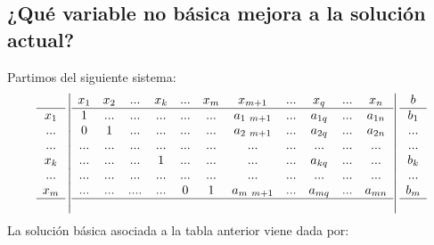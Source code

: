 \documentclass[11pt,fleqn]{book} %
\begin{document}
\subsection{¿Qué variable no básica mejora a la solución actual?}
Partimos del siguiente sistema:
$$
\begin{array}{c}
  \\ \hline
  x_1 \\
  ... \\
  ... \\
  x_k \\
  ... \\
  x_m \\ \hline
  ~
\end{array}
\left|
\begin{array}{cccccc}
  x_1 & x_2 & ... & x_k & ... & x_m \\ \hline
  1 & ... & ... &...& ...& ... \\
  0 & 1 & ... & ...& ...& ... \\
  ... & ... & ... & ... & ...& ... \\
  ... & ... & ... & 1 & ...& ... \\
  ... & ... & ... & ... & ...& ... \\
  ... & ...& .... & ... &  0  & 1\\ \hline
  & & & 
\end{array}
\begin{array}{ccccc}
  x_{m+1} & ... & x_q & ... & x_n \\ \hline
  a_{1 ~ m+1} & ... & a_{1q} & ... & a_{1n} \\
  a_{2 ~ m+1} & ... & a_{2q} & ... & a_{2n} \\
  ... & ... & ... & ...& ... \\
  ... & ... & a_{kq} & ...& ... \\
  ... & ... & ... & ...& ... \\
  a_{m ~ m+1} & ... & a_{mq} & ... & a_{mn} \\ \hline
  & & & &
\end{array}
\right|
\begin{array}{c}
  b \\ \hline
  b_1 \\
  ... \\
  ... \\
  b_k \\
  ... \\
  b_m \\ \hline
  ~
\end{array}
$$
La solución básica asociada a la tabla anterior viene dada por:
\end{document}
